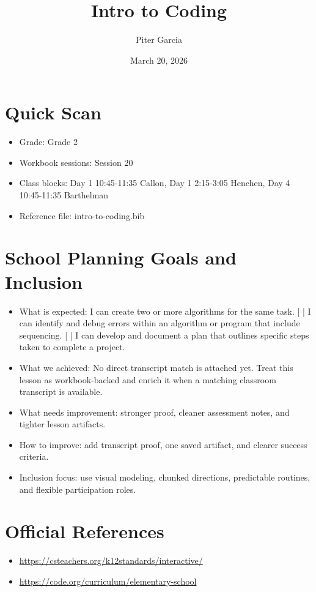 \documentclass[11pt]{article}
\title{Intro to Coding}
\author{Piter Garcia}
\date{March 20, 2026}
\begin{document}
    \maketitle
    \section*{Quick Scan}
    \begin{itemize}[leftmargin=*]
    \item Grade: Grade 2
    \item Workbook sessions: Session 20
    \item Class blocks: Day 1 10:45-11:35 Callon, Day 1 2:15-3:05 Henchen, Day 4 10:45-11:35 Barthelman
    \item Reference file: intro-to-coding.bib
    \end{itemize}
    \section*{School Planning Goals and Inclusion}
    \begin{itemize}[leftmargin=*]
    \item What is expected: I can create two or more algorithms for the same task. | | I can identify and debug errors within an algorithm or program that include sequencing. | | I can develop and document a plan that outlines specific steps taken to complete a project.
    \item What we achieved: No direct transcript match is attached yet. Treat this lesson as workbook-backed and enrich it when a matching classroom transcript is available.
    \item What needs improvement: stronger proof, cleaner assessment notes, and tighter lesson artifacts.
    \item How to improve: add transcript proof, one saved artifact, and clearer success criteria.
    \item Inclusion focus: use visual modeling, chunked directions, predictable routines, and flexible participation roles.
    \end{itemize}
    \section*{Official References}
    \begin{itemize}[leftmargin=*]
    \item \url{https://csteachers.org/k12standards/interactive/}
\item \url{https://code.org/curriculum/elementary-school}

    \end{itemize}
    
\end{document}
